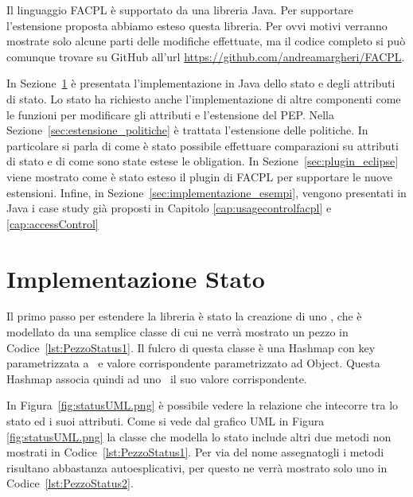 \label{cap:estensione_libreria}
Il linguaggio \ac{FACPL} è supportato da una libreria Java. Per supportare l'estensione proposta
abbiamo esteso questa libreria. Per ovvi motivi verranno mostrate solo alcune parti delle modifiche effettuate, ma 
il codice completo si può comunque trovare su GitHub all'url \url{https://github.com/andreamargheri/FACPL}.\par
In Sezione~\ref{sec:imp_stato} è presentata l'implementazione in Java dello stato e degli attributi di stato. Lo stato ha richiesto anche l'implementazione di altre componenti come le funzioni per modificare gli attributi e l'estensione del \ac{PEP}.
Nella Sezione~\ref{sec:estensione_politiche} è trattata l'estensione delle politiche. In particolare si parla di come è stato possibile 
effettuare comparazioni su attributi di stato e di come sono state estese le obligation.
In Sezione~\ref{sec:plugin_eclipse} viene mostrato come è stato esteso il plugin di \ac{FACPL} per supportare le nuove estensioni.
Infine, in Sezione~\ref{sec:implementazione_esempi}, vengono presentati in Java i case study già proposti in Capitolo \ref{cap:usagecontrolfacpl} e
\ref{cap:accessControl}
\section{Implementazione Stato}
\label{sec:imp_stato}
Il primo passo per estendere la libreria è stato la creazione di uno \status, che è modellato da una semplice classe 
di cui ne verrà mostrato un pezzo in Codice~\ref{lst:PezzoStatus1}. Il fulcro di questa classe è una Hashmap con key parametrizzata a 
\statusattribute \ e valore corrispondente parametrizzato ad Object. Questa Hashmap associa quindi ad uno \statusattribute\ il suo valore corrispondente.

In Figura~\ref{fig:statusUML.png} è possibile vedere la relazione che intecorre tra lo stato ed i suoi attributi. 
Come si vede dal grafico UML in Figura \ref{fig:statusUML.png} la classe che modella lo stato include altri due metodi non mostrati in Codice~\ref{lst:PezzoStatus1}. Per via del nome assegnatogli i metodi risultano abbastanza autoesplicativi, per questo ne verrà mostrato solo uno in Codice~\ref{lst:PezzoStatus2}.

